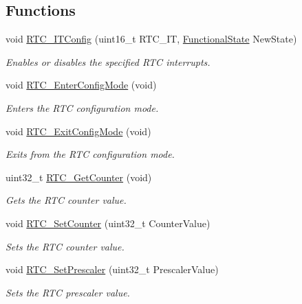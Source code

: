 \subsection*{Functions}
\begin{DoxyCompactItemize}
\item 
void \hyperlink{group___r_t_c___exported___functions_ga175dfe88866234730c1ec40d2221c4f4}{R\+T\+C\+\_\+\+I\+T\+Config} (uint16\+\_\+t R\+T\+C\+\_\+\+IT, \hyperlink{group___exported__types_gac9a7e9a35d2513ec15c3b537aaa4fba1}{Functional\+State} New\+State)
\begin{DoxyCompactList}\small\item\em Enables or disables the specified R\+TC interrupts. \end{DoxyCompactList}\item 
void \hyperlink{group___r_t_c___exported___functions_ga23612d9da2fe057a0cd72c684e5b438a}{R\+T\+C\+\_\+\+Enter\+Config\+Mode} (void)
\begin{DoxyCompactList}\small\item\em Enters the R\+TC configuration mode. \end{DoxyCompactList}\item 
void \hyperlink{group___r_t_c___exported___functions_ga7585aa6e2dbb497173b2fd03bac0d304}{R\+T\+C\+\_\+\+Exit\+Config\+Mode} (void)
\begin{DoxyCompactList}\small\item\em Exits from the R\+TC configuration mode. \end{DoxyCompactList}\item 
uint32\+\_\+t \hyperlink{group___r_t_c___exported___functions_ga6edb19a0ad8414a40610341121c5ea6c}{R\+T\+C\+\_\+\+Get\+Counter} (void)
\begin{DoxyCompactList}\small\item\em Gets the R\+TC counter value. \end{DoxyCompactList}\item 
void \hyperlink{group___r_t_c___exported___functions_gafa81ec17158de1d1a7740eca81b9fb65}{R\+T\+C\+\_\+\+Set\+Counter} (uint32\+\_\+t Counter\+Value)
\begin{DoxyCompactList}\small\item\em Sets the R\+TC counter value. \end{DoxyCompactList}\item 
void \hyperlink{group___r_t_c___exported___functions_gaf76be6071d1ba65b009e0791069e602c}{R\+T\+C\+\_\+\+Set\+Prescaler} (uint32\+\_\+t Prescaler\+Value)
\begin{DoxyCompactList}\small\item\em Sets the R\+TC prescaler value. \end{DoxyCompactList}\item 

\end{DoxyCompactItemize}
